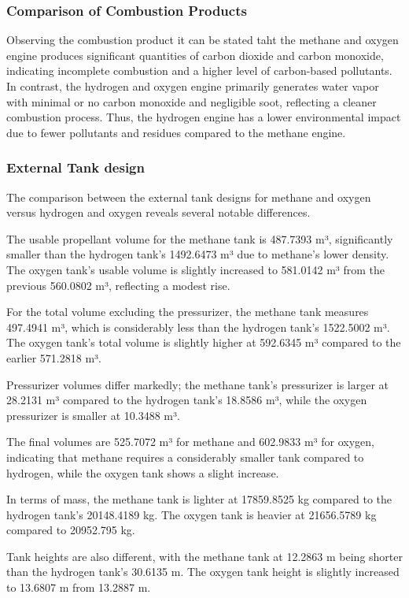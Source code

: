 \subsubsection{Comparison of Combustion Products}

Observing the combustion product it can be stated taht the methane and oxygen engine produces significant quantities of carbon dioxide and carbon monoxide, indicating incomplete combustion and a higher level of carbon-based pollutants. 
In contrast, the hydrogen and oxygen engine primarily generates water vapor with minimal or no carbon monoxide and negligible soot, reflecting a cleaner combustion process. Thus, the hydrogen engine has a lower environmental impact due to fewer pollutants and residues compared to the methane engine.

\subsubsection{External Tank design}

The comparison between the external tank designs for methane and oxygen versus hydrogen and oxygen reveals several notable differences.

The usable propellant volume for the methane tank is 487.7393 m³, significantly smaller than the hydrogen tank's 1492.6473 m³ due to methane's lower density. The oxygen tank's usable volume is slightly increased to 581.0142 m³ from the previous 560.0802 m³, reflecting a modest rise.

For the total volume excluding the pressurizer, the methane tank measures 497.4941 m³, which is considerably less than the hydrogen tank's 1522.5002 m³. The oxygen tank's total volume is slightly higher at 592.6345 m³ compared to the earlier 571.2818 m³.

Pressurizer volumes differ markedly; the methane tank's pressurizer is larger at 28.2131 m³ compared to the hydrogen tank's 18.8586 m³, while the oxygen pressurizer is smaller at 10.3488 m³.

The final volumes are 525.7072 m³ for methane and 602.9833 m³ for oxygen, indicating that methane requires a considerably smaller tank compared to hydrogen, while the oxygen tank shows a slight increase.

In terms of mass, the methane tank is lighter at 17859.8525 kg compared to the hydrogen tank’s 20148.4189 kg. The oxygen tank is heavier at 21656.5789 kg compared to 20952.795 kg.

Tank heights are also different, with the methane tank at 12.2863 m being shorter than the hydrogen tank's 30.6135 m. The oxygen tank height is slightly increased to 13.6807 m from 13.2887 m.

